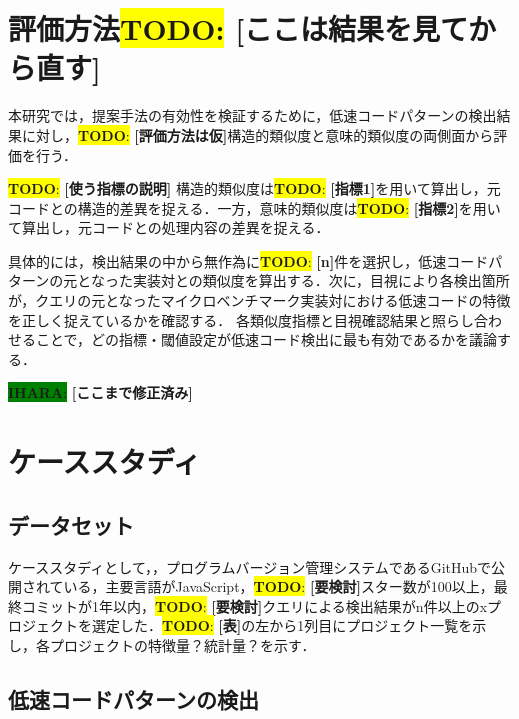 \documentclass[submit,techrep,noauthor]{ipsj}
\newcommand{\todo}[1]{\colorbox{yellow}{{\bf TODO}:}{\color{red} {\textbf{[#1]}}}}
\newcommand{\ihara}[1]{\colorbox{green}{{\bf IHARA}:}{\color{blue} {\textbf{[#1]}}}}
\begin{document}


\section{評価方法\todo{ここは結果を見てから直す}}

本研究では，提案手法の有効性を検証するために，低速コードパターンの検出結果に対し，\todo{評価方法は仮}構造的類似度と意味的類似度の両側面から評価を行う．

\todo{使う指標の説明}
構造的類似度は\todo{指標1}を用いて算出し，元コードとの構造的差異を捉える．一方，意味的類似度は\todo{指標2}を用いて算出し，元コードとの処理内容の差異を捉える．

具体的には，検出結果の中から無作為に\todo{n}件を選択し，低速コードパターンの元となった実装対との類似度を算出する．次に，目視により各検出箇所が，クエリの元となったマイクロベンチマーク実装対における低速コードの特徴を正しく捉えているかを確認する．
各類似度指標と目視確認結果と照らし合わせることで，どの指標・閾値設定が低速コード検出に最も有効であるかを議論する．


\ihara{ここまで修正済み}

\section{ケーススタディ}
\label{sec:case-study}

\subsection{データセット}

ケーススタディとして，，プログラムバージョン管理システムであるGitHubで公開されている，主要言語がJavaScript，\todo{要検討}スター数が100以上，最終コミットが1年以内，\todo{要検討}クエリによる検出結果がn件以上のxプロジェクトを選定した．\todo{表}の左から1列目にプロジェクト一覧を示し，各プロジェクトの特徴量？統計量？を示す．

\subsection{低速コードパターンの検出}
\end{document}
